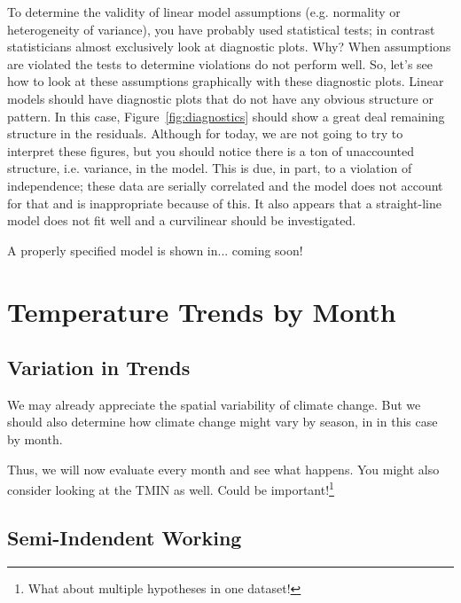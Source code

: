\documentclass{article}\usepackage[]{graphicx}\usepackage[]{color}
\begin{document}
To determine the validity of linear model assumptions (e.g. normality or heterogeneity of variance), you have probably used statistical tests; in contrast statisticians almost exclusively look at diagnostic plots. Why?  When assumptions are violated the tests to determine violations do not perform well. So, let's see how to look at these assumptions graphically with these diagnostic plots. Linear models should have diagnostic plots that do not have any obvious structure or pattern. In this case, Figure~\ref{fig:diagnostics} should show a great deal remaining structure in the residuals. Although for today, we are not going to try to interpret these figures, but you should notice there is a ton of unaccounted structure, i.e. variance, in the model. This is due, in part, to a violation of independence; these data are serially correlated and the model does not account for that and is inappropriate because of this. It also appears that a straight-line model does not fit well and a curvilinear should be investigated.

A properly specified model is shown in... coming soon! 


\section{Temperature Trends by Month}

\subsection{Variation in Trends}

We may already appreciate the spatial variability of climate change. But we should also determine how climate change might vary by season, in in this case by month. 

Thus, we will now evaluate every month and see what happens. You might also consider looking at the TMIN as well. Could be important!\footnote{What about multiple hypotheses in one dataset!}

\subsection{Semi-Indendent Working}
\end{document}
